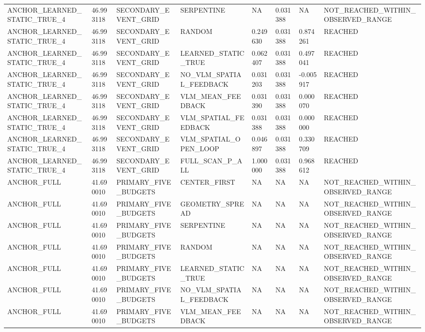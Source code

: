 \begin{tabular}{llllllll}
ANCHOR\_LEARNED\_STATIC\_TRUE\_4 & 46.993118 & SECONDARY\_EVENT\_GRID & SERPENTINE & NA & 0.031388 & NA & NOT\_REACHED\_WITHIN\_OBSERVED\_RANGE \\
ANCHOR\_LEARNED\_STATIC\_TRUE\_4 & 46.993118 & SECONDARY\_EVENT\_GRID & RANDOM & 0.249630 & 0.031388 & 0.874261 & REACHED \\
ANCHOR\_LEARNED\_STATIC\_TRUE\_4 & 46.993118 & SECONDARY\_EVENT\_GRID & LEARNED\_STATIC\_TRUE & 0.062407 & 0.031388 & 0.497041 & REACHED \\
ANCHOR\_LEARNED\_STATIC\_TRUE\_4 & 46.993118 & SECONDARY\_EVENT\_GRID & NO\_VLM\_SPATIAL\_FEEDBACK & 0.031203 & 0.031388 & -0.005917 & REACHED \\
ANCHOR\_LEARNED\_STATIC\_TRUE\_4 & 46.993118 & SECONDARY\_EVENT\_GRID & VLM\_MEAN\_FEEDBACK & 0.031390 & 0.031388 & 0.000070 & REACHED \\
ANCHOR\_LEARNED\_STATIC\_TRUE\_4 & 46.993118 & SECONDARY\_EVENT\_GRID & VLM\_SPATIAL\_FEEDBACK & 0.031388 & 0.031388 & 0.000000 & REACHED \\
ANCHOR\_LEARNED\_STATIC\_TRUE\_4 & 46.993118 & SECONDARY\_EVENT\_GRID & VLM\_SPATIAL\_OPEN\_LOOP & 0.046897 & 0.031388 & 0.330709 & REACHED \\
ANCHOR\_LEARNED\_STATIC\_TRUE\_4 & 46.993118 & SECONDARY\_EVENT\_GRID & FULL\_SCAN\_P\_ALL & 1.000000 & 0.031388 & 0.968612 & REACHED \\
ANCHOR\_FULL & 41.690010 & PRIMARY\_FIVE\_BUDGETS & CENTER\_FIRST & NA & NA & NA & NOT\_REACHED\_WITHIN\_OBSERVED\_RANGE \\
ANCHOR\_FULL & 41.690010 & PRIMARY\_FIVE\_BUDGETS & GEOMETRY\_SPREAD & NA & NA & NA & NOT\_REACHED\_WITHIN\_OBSERVED\_RANGE \\
ANCHOR\_FULL & 41.690010 & PRIMARY\_FIVE\_BUDGETS & SERPENTINE & NA & NA & NA & NOT\_REACHED\_WITHIN\_OBSERVED\_RANGE \\
ANCHOR\_FULL & 41.690010 & PRIMARY\_FIVE\_BUDGETS & RANDOM & NA & NA & NA & NOT\_REACHED\_WITHIN\_OBSERVED\_RANGE \\
ANCHOR\_FULL & 41.690010 & PRIMARY\_FIVE\_BUDGETS & LEARNED\_STATIC\_TRUE & NA & NA & NA & NOT\_REACHED\_WITHIN\_OBSERVED\_RANGE \\
ANCHOR\_FULL & 41.690010 & PRIMARY\_FIVE\_BUDGETS & NO\_VLM\_SPATIAL\_FEEDBACK & NA & NA & NA & NOT\_REACHED\_WITHIN\_OBSERVED\_RANGE \\
ANCHOR\_FULL & 41.690010 & PRIMARY\_FIVE\_BUDGETS & VLM\_MEAN\_FEEDBACK & NA & NA & NA & NOT\_REACHED\_WITHIN\_OBSERVED\_RANGE \\

\end{tabular}
